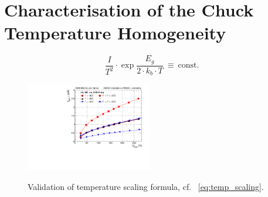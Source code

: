 \section{Characterisation of the Chuck Temperature Homogeneity}
\label{appendix:chuck_temp}

\begin{equation}
    \label{eq:temp_scaling}
    \frac{I}{T^2}\cdot \exp{\frac{E_g}{2\cdot k_b \cdot T}}~\equiv~\text{const.}
\end{equation}

\begin{figure}[h]
	\centering
	\includegraphics[width=0.49\textwidth]{plots/iv_temp_scaling/iv_overlay_ch24.pdf}
	\label{plot:iv_tempscaling}
	\caption{
	    Validation of temperature scaling formula, cf. ~\ref{eq:temp_scaling}.
	}
\end{figure}

